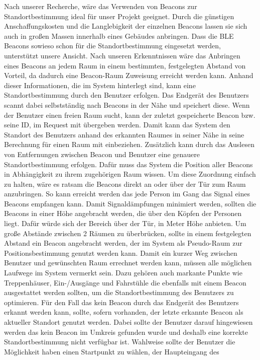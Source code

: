 Nach unserer Recherche, wäre das Verwenden von Beacons zur Standortbestimmung
ideal für unser Projekt geeignet. Durch die günstigen Anschaffungskosten und
die Langlebigkeit der einzelnen Beacons lassen sie sich auch in großen Massen
innerhalb eines Gebäudes anbringen. Dass die BLE Beacons sowieso schon für die
Standortbestimmung eingesetzt werden, unterstützt unsere Ansicht.
Nach unseren Erkenntnissen wäre das Anbringen eines Beacons an jedem Raum
\bzw in einem bestimmten, festgelegten Abstand von Vorteil, da dadurch eine
Beacon-Raum Zuweisung erreicht werden kann. Anhand dieser Informationen, die im
System hinterlegt sind, kann eine Standortbestimmung durch den Benutzer
erfolgen. Das Endgerät des Benutzers scannt dabei selbstständig nach Beacons in
der Nähe und speichert diese. Wenn der Benutzer einen freien Raum sucht, kann
der zuletzt gespeicherte Beacon bzw. seine ID, im Request mit übergeben werden.
Damit kann das System den Standort des Benutzers anhand des erkannten Raumes in
seiner Nähe in seine Berechnung für einen Raum mit einbeziehen. Zusätzlich kann
durch das Auslesen von Entfernungen zwischen Beacon und Benutzer eine genauere
Standortbestimmung erfolgen. Dafür muss das System die Position aller Beacons in
Abhängigkeit zu ihrem zugehörigen Raum wissen. Um diese Zuordnung einfach zu
halten, wäre es ratsam die Beacons direkt an oder über der Tür zum Raum
anzubringen. So kann erreicht werden das jede Person im Gang das Signal eines
Beacons empfangen kann. Damit Signaldämpfungen minimiert werden, sollten die
Beacons in einer Höhe angebracht werden, die über den Köpfen der Personen
liegt. Dafür würde sich der Bereich über der Tür, in  Meter Höhe anbieten.
Um große Abstände zwischen 2 Räumen zu überbrücken, sollte in einem
festgelegten Abstand ein Beacon angebracht werden, der im System als
Pseudo-Raum zur Positionsbestimmung genutzt werden kann. Damit ein kurzer Weg
zwischen Benutzer und gewünschten Raum errechnet werden kann, müssen alle
möglichen Laufwege im System vermerkt sein. Dazu gehören auch markante Punkte
wie Treppenhäuser, Ein-/Ausgänge und Fahrstühle die ebenfalls mit einem Beacon
ausgestattet werden sollten, um die Standortbestimmung des Benutzers zu
optimieren. Für den Fall das kein Beacon durch das Endgerät des Benutzers
erkannt werden kann, sollte, sofern vorhanden, der letzte erkannte Beacon als
aktueller Standort genutzt werden. Dabei sollte der Benutzer darauf hingewiesen
werden das kein Beacon im Umkreis gefunden wurde und deshalb eine korrekte
Standortbestimmung nicht verfügbar ist. Wahlweise sollte der Benutzer die
Möglichkeit haben einen Startpunkt zu wählen, \bspw der Haupteingang des

